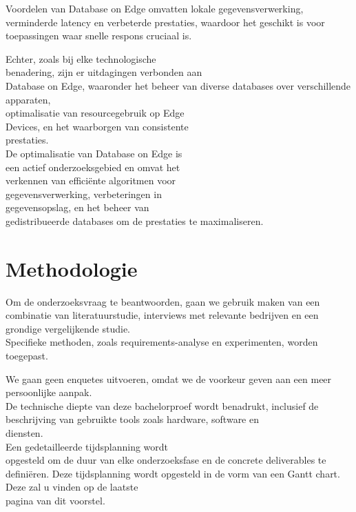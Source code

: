 Voordelen van Database on Edge omvatten lokale gegevensverwerking, verminderde latency en verbeterde prestaties,
 waardoor het geschikt is voor toepassingen waar snelle respons cruciaal is.

Echter, zoals bij elke technologische \\ benadering, zijn er uitdagingen verbonden aan \\ Database on Edge,
 waaronder het beheer van diverse databases over verschillende apparaten,
 \\ optimalisatie van resourcegebruik op Edge \\ Devices, en het waarborgen van consistente \\ prestaties. \\

De optimalisatie van Database on Edge is \\ een actief onderzoeksgebied 
 en omvat het \\ verkennen van efficiënte algoritmen voor \\ gegevensverwerking,
  verbeteringen in \\ gegevensopslag, en het beheer van \\ gedistribueerde databases om de prestaties te maximaliseren.

\newpage


\section{Methodologie}%
\label{sec:methodologie}

Om de onderzoeksvraag te beantwoorden, gaan we gebruik maken van een combinatie van literatuurstudie,
 interviews met relevante bedrijven en een grondige vergelijkende studie. \\
 
Specifieke methoden, zoals requirements-analyse en experimenten, worden toegepast.

We gaan geen enquetes uitvoeren, omdat we de voorkeur geven aan een meer persoonlijke aanpak. \\
 
De technische diepte van deze bachelorproef wordt benadrukt,
 inclusief de beschrijving van gebruikte tools zoals hardware, software en \\ diensten. \\

Een gedetailleerde tijdsplanning wordt \\ opgesteld om de duur van elke onderzoeksfase en de concrete deliverables te definiëren.
Deze tijdsplanning wordt opgesteld in de vorm van een Gantt chart. Deze zal u vinden op de laatste \\ pagina van dit voorstel.




